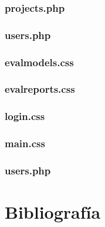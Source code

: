 \documentclass[12pt,a4paper,spanish,twoside]{article}
\begin{document}
\subsubsection{projects.php}

\subsubsection{users.php}


\subsubsection{evalmodels.css}

\subsubsection{evalreports.css}

\subsubsection{login.css}

\subsubsection{main.css}

\subsubsection{users.php}


\section{Bibliografía}
\end{document}
